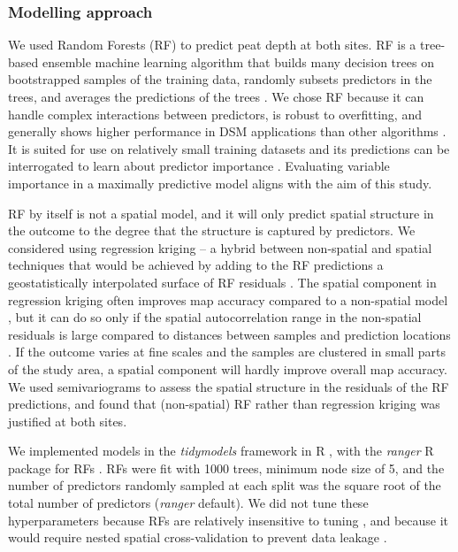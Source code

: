 \documentclass[soil, manuscript]{copernicus}
\begin{document}
\subsubsection{Modelling approach}

We used Random Forests (RF) to predict peat depth at both sites.
RF is a tree-based ensemble machine learning algorithm that builds many decision trees on bootstrapped samples of the training data, randomly subsets predictors in the trees, and averages the predictions of the trees \citep{breimanRandomForests2001}.
We chose RF because it can handle complex interactions between predictors, is robust to overfitting, and generally shows higher performance in DSM applications than other algorithms \citep{beguinPredictingSoilProperties2017, nussbaumEvaluationDigitalSoil2018, lamichhaneDigitalSoilMapping2019}.
It is suited for use on relatively small training datasets and its predictions can be interrogated to learn about predictor importance \citep{khaledianSelectingAppropriateMachine2020}.
Evaluating variable importance in a maximally predictive model aligns with the aim of this study.

RF by itself is not a spatial model, and it will only predict spatial structure in the outcome to the degree that the structure is captured by predictors.
We considered using regression kriging -- a hybrid between non-spatial and spatial techniques that would be achieved by adding to the RF predictions a geostatistically interpolated surface of RF residuals \citep{henglGenericFrameworkSpatial2004}.
The spatial component in regression kriging often improves map accuracy compared to a non-spatial model \citep{beguinPredictingSoilProperties2017, lamichhaneDigitalSoilMapping2019, mollaMachineLearningGeostatistical2023}, but it can do so only if the spatial autocorrelation range in the non-spatial residuals is large compared to distances between samples and prediction locations \citep{henglGenericFrameworkSpatial2004, szaboMappingSoilHydraulic2019, takoutsingComparingPredictionPerformance2022}.
If the outcome varies at fine scales and the samples are clustered in small parts of the study area, a spatial component will hardly improve overall map accuracy.
We used semivariograms to assess the spatial structure in the residuals of the RF predictions, and found that (non-spatial) RF rather than regression kriging was justified at both sites.

We implemented models in the \emph{tidymodels} framework in R \citep{kuhnTidymodelsCollectionPackages2020}, with the \emph{ranger} R package for RFs \citep[v0.16,][]{wrightRangerFastImplementation2017}.
RFs were fit with 1000 trees, minimum node size of 5, and the number of predictors randomly sampled at each split was the square root of the total number of predictors (\emph{ranger} default).
We did not tune these hyperparameters because RFs are relatively insensitive to tuning \citep{probstHyperparametersTuningStrategies2019}, and because it would require nested spatial cross-validation to prevent data leakage \citep{schratzHyperparameterTuningPerformance2019}.
\end{document}
